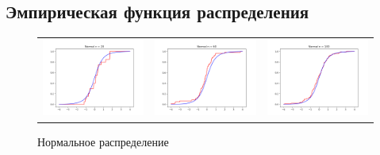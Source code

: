 \subsection{Эмпирическая функция распределения}
	\begin{figure}[H]
		\centering
		\begin{tabular}{ccc}
			\includegraphics[width=55mm, height =0.25\textheight]{pics/emp_n_20.png}
			&
			\includegraphics[width=55mm, height =0.25\textheight]{pics/emp_n_60.png}
			&
			\includegraphics[width=55mm, height =0.25\textheight]{pics/emp_n_100.png}
		\end{tabular}
		\caption{Нормальное распределение}
		\label{fig:normal}
	\end{figure}

